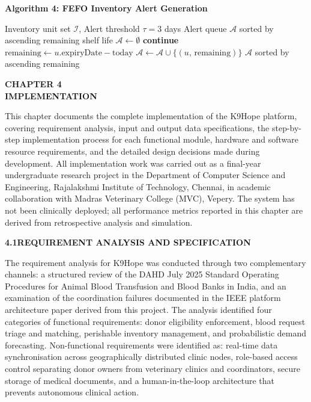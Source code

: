 \documentclass[12pt,a4paper]{article}
\begin{document}
\vspace{1.2em}
\noindent\textbf{Algorithm 4: FEFO Inventory Alert Generation}

\begin{algorithm}[H]
\caption{First-Expiry-First-Out (FEFO) Alert Generation}
\begin{algorithmic}[1]
\Require Inventory unit set $\mathcal{I}$, Alert threshold $\tau = 3$ days
\Ensure Alert queue $\mathcal{A}$ sorted by ascending remaining shelf life
\State $\mathcal{A} \leftarrow \emptyset$
     \textbf{continue} \EndIf
    \State $\text{remaining} \leftarrow u.\text{expiryDate} - \text{today}$
        \State $\mathcal{A} \leftarrow \mathcal{A} \cup \{(u,\, \text{remaining})\}$
    \EndIf
\EndFor
\State \Return $\mathcal{A}$ sorted by ascending remaining
\end{algorithmic}
\end{algorithm}

\newpage
\begin{center}
    \textbf{\large CHAPTER 4}\\[0.4em]
    \textbf{\large IMPLEMENTATION}
\end{center}
\vspace{1.5em}

\noindent This chapter documents the complete implementation of the K9Hope platform, covering requirement analysis, input and output data specifications, the step-by-step implementation process for each functional module, hardware and software resource requirements, and the detailed design decisions made during development. All implementation work was carried out as a final-year undergraduate research project in the Department of Computer Science and Engineering, Rajalakshmi Institute of Technology, Chennai, in academic collaboration with Madras Veterinary College (MVC), Vepery. The system has not been clinically deployed; all performance metrics reported in this chapter are derived from retrospective analysis and simulation.

\vspace{2em}
\noindent\textbf{4.1\quad REQUIREMENT ANALYSIS AND SPECIFICATION}
\vspace{0.8em}

\noindent The requirement analysis for K9Hope was conducted through two complementary channels: a structured review of the DAHD July 2025 Standard Operating Procedures for Animal Blood Transfusion and Blood Banks in India, and an examination of the coordination failures documented in the IEEE platform architecture paper derived from this project. The analysis identified four categories of functional requirements: donor eligibility enforcement, blood request triage and matching, perishable inventory management, and probabilistic demand forecasting. Non-functional requirements were identified as: real-time data synchronisation across geographically distributed clinic nodes, role-based access control separating donor owners from veterinary clinics and coordinators, secure storage of medical documents, and a human-in-the-loop architecture that prevents autonomous clinical action.
\end{document}
